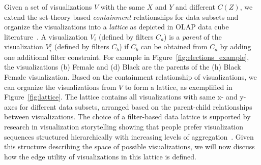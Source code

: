 \npar Given a set of visualizations $V$ with the same $X$ and $Y$ and different $C(Z)$, we extend the set-theory based \emph{containment} relationships for data subsets and organize the visualizations into a \textit{lattice} as depicted in OLAP data cube literature~\cite{Xin2007}. A visualization $V_i$ (defined by filters $C_a$) is a \textit{parent} of the visualization $V_i^j$ (defined by filters $C_b$) if $C_b$ can be obtained from $C_a$ by adding one additional filter constraint. For example in Figure~\ref{fig:elections_example}, the visualizations (b) Female and (d) Black are the parents of the (h) Black Female visualization. Based on the containment relationship of visualizations, we can organize the visualizations from $V$ to form a lattice, as exemplified in Figure~\ref{fig:lattice}. The lattice contains all visualizations with same x- and y- axes for different data subsets, arranged based on the parent-child relationships between visualizations. The choice of a filter-based data lattice is supported by research in visualization storytelling showing that people prefer visualization sequences structured hierarchically with increasing levels of aggregation~\cite{Kim2017,Hullman2017,Hullman2013}. Given this structure describing the space of possible visualizations, we will now discuss how the edge utility of visualizations in this lattice is defined.


